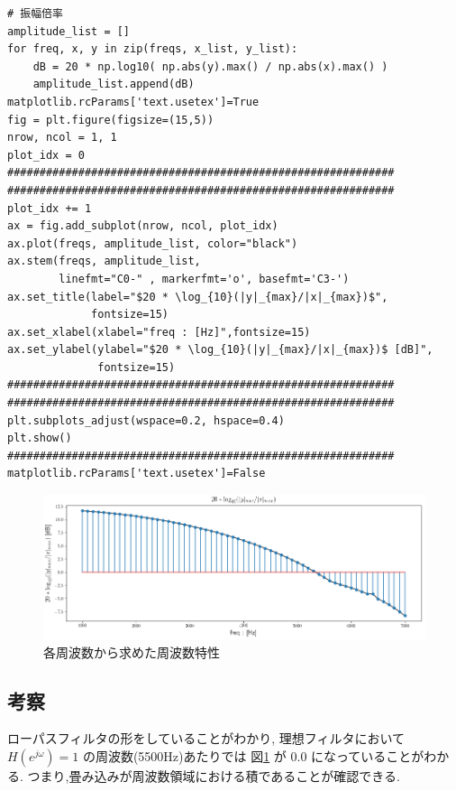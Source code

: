 \documentclass[12pt]{jsarticle}
\begin{document}
        \begin{lstlisting}[basicstyle=\ttfamily\footnotesize, frame=single]
# 振幅倍率
amplitude_list = []
for freq, x, y in zip(freqs, x_list, y_list):
    dB = 20 * np.log10( np.abs(y).max() / np.abs(x).max() )
    amplitude_list.append(dB)
matplotlib.rcParams['text.usetex']=True
fig = plt.figure(figsize=(15,5))
nrow, ncol = 1, 1
plot_idx = 0
############################################################
############################################################
plot_idx += 1
ax = fig.add_subplot(nrow, ncol, plot_idx)
ax.plot(freqs, amplitude_list, color="black")
ax.stem(freqs, amplitude_list,
        linefmt="C0-" , markerfmt='o', basefmt='C3-')
ax.set_title(label="$20 * \log_{10}(|y|_{max}/|x|_{max})$",
             fontsize=15)
ax.set_xlabel(xlabel="freq : [Hz]",fontsize=15)
ax.set_ylabel(ylabel="$20 * \log_{10}(|y|_{max}/|x|_{max})$ [dB]",
              fontsize=15)
############################################################
############################################################
plt.subplots_adjust(wspace=0.2, hspace=0.4)
plt.show()
############################################################
matplotlib.rcParams['text.usetex']=False
				\end{lstlisting}

    		\begin{figure}[H]
    			\begin{center}
    				\includegraphics[width=1.0\columnwidth]{img/frequency_property_from_each_freq.png}
    				\caption{各周波数から求めた周波数特性}
    				\label{img-frequency_property_from_each_freq}
    			\end{center}
    		\end{figure}

      \subsection{考察} \label{考察}
        ローパスフィルタの形をしていることがわかり,
        理想フィルタにおいて $H(e^{j \omega}) = 1$ の周波数(5500Hz)あたりでは
        図\ref{img-frequency_property_from_each_freq} が $0.0$ になっていることがわかる.
        つまり,畳み込みが周波数領域における積であることが確認できる.
        
\end{document}
